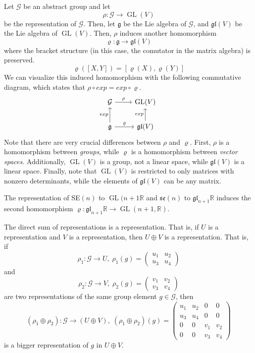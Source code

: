 \documentclass{article}
\DeclareMathOperator{\GL}{GL}
\begin{document}
    Let $\mathcal{G}$ be an abstract group and let
    \[\rho: \mathcal{G} \longrightarrow \GL(V)\]
    be the representation of $\mathcal{G}$. Then, let $\mathfrak{g}$ be the Lie algebra of $\mathcal{G}$, and $\mathfrak{gl}(V)$ be the Lie algebra of $\GL(V)$. Then, $\rho$ induces another homomorphism 
    \[\varrho: \mathfrak{g} \longrightarrow \mathfrak{gl}(V)\]
    where the bracket structure (in this case, the comutator in the matrix algebra) is preserved. 
    \[\varrho([X,Y]) = [\varrho(X), \varrho(Y)]\]
    We can visualize this induced homomorphism with the following commutative diagram, which states that $\rho \circ exp = exp \circ \varrho$. 
    \[\begin{tikzcd}
    \mathcal{G} \arrow{r}{\rho} & \GL(V)\\
    \mathfrak{g} \arrow{u}{exp} \arrow{r}{\varrho} & \mathfrak{gl}(V) \arrow{u}{exp}
    \end{tikzcd}\]
    Note that there are very crucial differences between $\rho$ and $\varrho$. First, $\rho$ is a homomorphism between \textit{groups}, while $\varrho$ is a homomorphism between \textit{vector spaces}. Additionally, $\GL(V)$ is a group, not a linear space, while $\mathfrak{gl}(V)$ is a linear space. Finally, note that $\GL(V)$ is restricted to only matrices with nonzero determinants, while the elements of $\mathfrak{gl}(V)$ can be any matrix. 

    \begin{example}
    The representation of SE$(n)$ to $\GL(n+1 \mathbb{R}$ and $\mathfrak{se}(n)$ to $\mathfrak{gl}_{n+1} \mathbb{R}$ induces the second homomorphism $\varrho: \mathfrak{gl}_{n+1} \mathbb{R} \longrightarrow \GL(n+1, \mathbb{R})$. 
    \end{example}

    \begin{definition}
    The direct sum of representations is a representation. That is, if $U$ is a representation and $V$ is a representation, then $U \oplus V$ is a representation. That is, if 
    \[\rho_1: \mathcal{G} \longrightarrow U, \; \rho_1 (g) = \begin{pmatrix}
    u_1&u_2\\u_3&u_4
    \end{pmatrix}\]
    and
    \[\rho_2: \mathcal{G} \longrightarrow V, \; \rho_2 (g) = \begin{pmatrix}
    v_1 & v_2 \\ v_3 & v_4
    \end{pmatrix}\]
    are two representations of the same group element $g \in \mathcal{G}$, then 
    \[(\rho_1 \oplus \rho_2): \mathcal{G} \longrightarrow (U \oplus V), \;(\rho_1 \oplus \rho_2) (g) = \begin{pmatrix}
    u_1 & u_2 & 0 & 0 \\
    u_3 & u_4 & 0 & 0 \\
    0 & 0 & v_1 & v_2 \\
    0 & 0 & v_3 & v_4 
    \end{pmatrix}\]
    is a bigger representation of $g$ in $U \oplus V$. 
    \end{definition}
\end{document}
